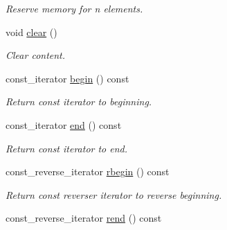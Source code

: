 \begin{DoxyCompactItemize}
\begin{DoxyCompactList}\small\item\em Reserve memory for {\itshape n} elements. \end{DoxyCompactList}\item 
\hypertarget{classmerlin_1_1set_ae57be6d7589cfcc00a8fd582205722f9}{}void \hyperlink{classmerlin_1_1set_ae57be6d7589cfcc00a8fd582205722f9}{clear} ()\label{classmerlin_1_1set_ae57be6d7589cfcc00a8fd582205722f9}

\begin{DoxyCompactList}\small\item\em Clear content. \end{DoxyCompactList}\item 
\hypertarget{classmerlin_1_1set_ac8f64095116304f7edee89c37771e046}{}const\+\_\+iterator \hyperlink{classmerlin_1_1set_ac8f64095116304f7edee89c37771e046}{begin} () const \label{classmerlin_1_1set_ac8f64095116304f7edee89c37771e046}

\begin{DoxyCompactList}\small\item\em Return const iterator to beginning. \end{DoxyCompactList}\item 
\hypertarget{classmerlin_1_1set_a68ae0e206fe3821db7e53d05d347551b}{}const\+\_\+iterator \hyperlink{classmerlin_1_1set_a68ae0e206fe3821db7e53d05d347551b}{end} () const \label{classmerlin_1_1set_a68ae0e206fe3821db7e53d05d347551b}

\begin{DoxyCompactList}\small\item\em Return const iterator to end. \end{DoxyCompactList}\item 
\hypertarget{classmerlin_1_1set_aa0783ca6e1d73d3c51b051a4e3c97434}{}const\+\_\+reverse\+\_\+iterator \hyperlink{classmerlin_1_1set_aa0783ca6e1d73d3c51b051a4e3c97434}{rbegin} () const \label{classmerlin_1_1set_aa0783ca6e1d73d3c51b051a4e3c97434}

\begin{DoxyCompactList}\small\item\em Return const reverser iterator to reverse beginning. \end{DoxyCompactList}\item 
\hypertarget{classmerlin_1_1set_a2b87199b2c744d13285365c94298d238}{}const\+\_\+reverse\+\_\+iterator \hyperlink{classmerlin_1_1set_a2b87199b2c744d13285365c94298d238}{rend} () const \label{classmerlin_1_1set_a2b87199b2c744d13285365c94298d238}


\end{DoxyCompactItemize}
